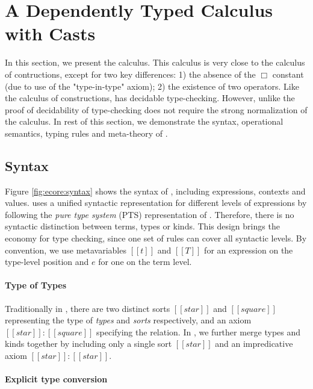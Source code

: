 
\section{A Dependently Typed Calculus with Casts}\label{sec:ecore}

In this section, we present the \ecore calculus. This calculus is very 
close to the calculus of contructions, except for two key differences: 
1) the absence of the $\Box$ constant (due to use of the "type-in-type"
axiom); 2) the existence of two \cast operators. Like the calculus 
of constructions, \ecore has decidable type-checking. However, unlike
\cc the proof of decidability of type-checking does not require 
the strong normalization of the calculus. 
In rest of this
section, we demonstrate the syntax, operational semantics, typing
rules and meta-theory of \ecore.


\subsection{Syntax}\label{sec:ecore:syn}

Figure \ref{fig:ecore:syntax} shows the syntax of \ecore, including
expressions, contexts and values. \ecore uses a unified syntactic
representation for different levels of expressions by following the
\emph{pure type system} (PTS) representation of \cc. Therefore, there
is no syntactic distinction between terms, types or kinds. This design
brings the economy for type checking, since one set of rules can cover
all syntactic levels. By convention, we use metavariables $[[t]]$ and
$[[T]]$ for an expression on the type-level position and $e$ for one
on the term level.

\paragraph{Type of Types}
Traditionally in \cc, there are two distinct
sorts $[[star]]$ and $[[square]]$ representing the type of
\emph{types} and \emph{sorts} respectively, and an axiom
$[[star]]:[[square]]$ specifying the relation. In \ecore, we further
merge types and kinds together by including only a single sort
$[[star]]$ and an impredicative axiom $[[star]]:[[star]]$. 


\paragraph{Explicit type conversion}

